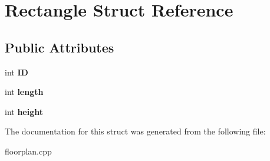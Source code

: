 \hypertarget{structRectangle}{\section{Rectangle Struct Reference}
\label{structRectangle}
}
\subsection*{Public Attributes}
\begin{DoxyCompactItemize}
\item 
\hypertarget{structRectangle_acb6f320ca8716ad841f0e8c7c032cd25}{int {\bfseries I\-D}}\label{structRectangle_acb6f320ca8716ad841f0e8c7c032cd25}

\item 
\hypertarget{structRectangle_ae59ba4b220bd28539821b64b48553b75}{int {\bfseries length}}\label{structRectangle_ae59ba4b220bd28539821b64b48553b75}

\item 
\hypertarget{structRectangle_ac564db1ed0dd61dd82a5276399bc72ad}{int {\bfseries height}}\label{structRectangle_ac564db1ed0dd61dd82a5276399bc72ad}

\end{DoxyCompactItemize}


The documentation for this struct was generated from the following file\-:\begin{DoxyCompactItemize}
\item 
floorplan.\-cpp\end{DoxyCompactItemize}
